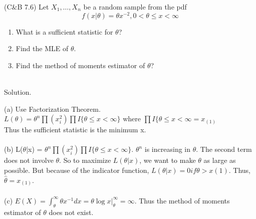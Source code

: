 \documentclass[11pt,fleqn]{book} %
\begin{document}
	\begin{problem} (C\&B 7.6) Let $X_1, \dots, X_n$ be a random sample from the pdf
	$$f(x|\theta) = \theta x^{-2}, 0<\theta\le x < \infty $$

	\begin{enumerate}[label=(\alph*)]
		\item What is a sufficient statistic for $\theta$?
		\item Find the MLE of $\theta$.
		\item Find the method of moments estimator of $\theta$?\\
		\\
	\end{enumerate}
		

		Solution. 

		(a) Use Factorization Theorem.\\ 
		$L(\theta) = \theta^n \prod(x_i^2) \prod I\{\theta \le x < \infty\}$ where $\prod I\{\theta \le x < \infty = x_{(1)}$\\
		Thus the sufficient statistic is the minimum x. \\
		\\
		(b) L($\theta$|x) = $\theta^n \prod(x_i^2) \prod I\{\theta \le x < \infty \}$. $\theta^n$ is increasing in $\theta$. The second term does not involve $\theta$. So to maximize $L(\theta|x)$, we want to make $\theta$ as large as possible. But because of the indicator function, $L(\theta|x) = 0 if \theta > x(1)$. Thus, $\hat{\theta} = x_{(1)}$.\\
		\\
		(c) $E(X) = \int^\infty_\theta \theta x^{-1} dx = \theta \log x|^\infty_\theta = \infty$. Thus the method of moments estimator of $\theta$ does not exist.\\
		\\

	\end{problem}
\end{document}
